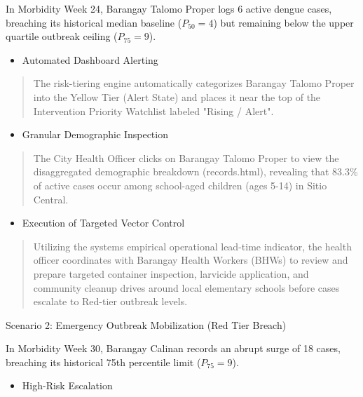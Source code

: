 \documentclass[
]{article}
\begin{document}
In Morbidity Week 24, Barangay Talomo Proper logs 6 active dengue cases,
breaching its historical median baseline (\(P_{50} = 4\)) but remaining
below the upper quartile outbreak ceiling (\(P_{75} = 9\)).

\begin{itemize}
\item
  Automated Dashboard Alerting
\end{itemize}

\begin{quote}
The risk-tiering engine automatically categorizes Barangay Talomo Proper
into the Yellow Tier (Alert State) and places it near the top of the
Intervention Priority Watchlist labeled "Rising / Alert".
\end{quote}

\begin{itemize}
\item
  Granular Demographic Inspection
\end{itemize}

\begin{quote}
The City Health Officer clicks on Barangay Talomo Proper to view the
disaggregated demographic breakdown (records.html), revealing that
83.3\% of active cases occur among school-aged children (ages 5-14) in
Sitio Central.
\end{quote}

\begin{itemize}
\item
  Execution of Targeted Vector Control
\end{itemize}

\begin{quote}
Utilizing the system\textquotesingle s empirical operational lead-time
indicator, the health officer coordinates with Barangay Health Workers
(BHWs) to review and prepare targeted container inspection, larvicide
application, and community cleanup drives around local elementary
schools before cases escalate to Red-tier outbreak levels.
\end{quote}

Scenario 2: Emergency Outbreak Mobilization (Red Tier Breach)

In Morbidity Week 30, Barangay Calinan records an abrupt surge of 18
cases, breaching its historical 75th percentile limit (\(P_{75} = 9\)).

\begin{itemize}
\item
  High-Risk Escalation
\end{itemize}
\end{document}
